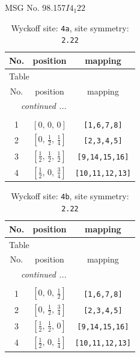 \documentclass[fleqn,8pt]{jsarticle}
\begin{document}
\setcounter{MaxMatrixCols}{32}

\renewcommand{\tablename}{Table~}
\renewcommand{\figurename}{Figure~}
\begin{center}
\LARGE
MSG No. 98.157\quad$I4_{1}22$
\end{center}
\renewcommand{\arraystretch}{1.2}
\begin{longtable}{ccc}
\caption{Wyckoff site: {\tt 4a}, site symmetry: {\tt 2.22}}
 \\
 \hline \hline
No. & position & mapping \\ \hline \endfirsthead

\multicolumn{2}{l}{\tablename\ \thetable{}} \\
 \hline \hline
No. & position & mapping \\ \hline \endhead

 \hline \hline
\multicolumn{2}{r}{\footnotesize\it continued ...} \\ \endfoot

 \hline \hline
\multicolumn{2}{r}{} \\ \endlastfoot

1 & $\left[ 0,\, 0,\, 0 \right]$ & {\tt [1,6,7,8]} \\ \hline
2 & $\left[ 0,\, \frac{1}{2},\, \frac{1}{4} \right]$ & {\tt [2,3,4,5]} \\ \hline
3 & $\left[ \frac{1}{2},\, \frac{1}{2},\, \frac{1}{2} \right]$ & {\tt [9,14,15,16]} \\ \hline
4 & $\left[ \frac{1}{2},\, 0,\, \frac{3}{4} \right]$ & {\tt [10,11,12,13]} \\
\end{longtable}
\renewcommand{\arraystretch}{1.2}
\begin{longtable}{ccc}
\caption{Wyckoff site: {\tt 4b}, site symmetry: {\tt 2.22}}
 \\
 \hline \hline
No. & position & mapping \\ \hline \endfirsthead

\multicolumn{2}{l}{\tablename\ \thetable{}} \\
 \hline \hline
No. & position & mapping \\ \hline \endhead

 \hline \hline
\multicolumn{2}{r}{\footnotesize\it continued ...} \\ \endfoot

 \hline \hline
\multicolumn{2}{r}{} \\ \endlastfoot

1 & $\left[ 0,\, 0,\, \frac{1}{2} \right]$ & {\tt [1,6,7,8]} \\ \hline
2 & $\left[ 0,\, \frac{1}{2},\, \frac{3}{4} \right]$ & {\tt [2,3,4,5]} \\ \hline
3 & $\left[ \frac{1}{2},\, \frac{1}{2},\, 0 \right]$ & {\tt [9,14,15,16]} \\ \hline
4 & $\left[ \frac{1}{2},\, 0,\, \frac{1}{4} \right]$ & {\tt [10,11,12,13]} \\
\end{longtable}
\end{document}
